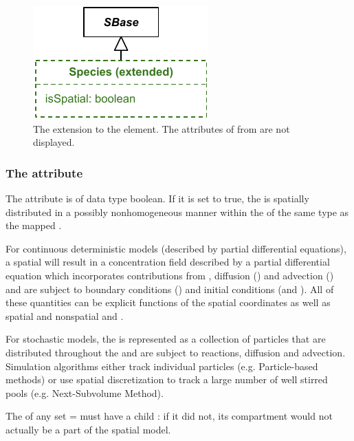 \begin{figure}[ht]
  \includegraphics{figs/extended-species-uml}
  \caption{The extension to the \Species element. The attributes of \Species from \sbmlthreecore are not displayed.}
  \label{species-uml}
\end{figure}



\subsubsection{The  attribute}
The  attribute is of data type boolean. If it is set to true, the \Species is spatially distributed in a possibly nonhomogeneous manner within the \Domains of the same type as the mapped \DomainType. 

For continuous deterministic models (described by partial differential equations), a spatial \Species will result in a concentration field described by a partial differential equation which incorporates contributions from \Reactions, diffusion (\DiffusionCoefficient) and advection (\AdvectionCoefficient) and are subject to boundary conditions (\BoundaryCondition) and initial conditions (\InitialAssignment and \Rule).  All of these quantities can be explicit functions of the spatial coordinates as well as spatial and nonspatial \Parameters and \Species.  

For stochastic models, the \Species is represented as a collection of particles that are distributed throughout the \Domains and are subject to reactions, diffusion and advection.  Simulation algorithms either track individual particles (e.g. Particle-based methods) or use spatial discretization to track a large number of well stirred pools (e.g. Next-Subvolume Method).

The  of any \Species set  =  must have a child \CompartmentMapping: if it did not, its compartment would not actually be a part of the spatial model.


